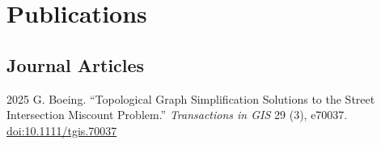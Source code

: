 \documentclass[11pt,letterpaper]{report} %
\begin{document}
    \section*{Publications}

    \subsection*{Journal Articles}

    \begin{tablist}







        \item[2025] \tab{}G. Boeing. \enquote{Topological Graph Simplification Solutions to the Street Intersection Miscount Problem.} \textit{Transactions in GIS} 29 (3), e70037. \href{https://doi.org/10.1111/tgis.70037}{doi:10.1111/tgis.70037}


\end{tablist}
\end{document}
